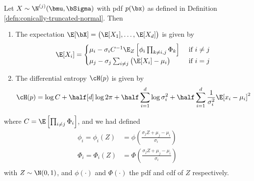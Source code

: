 \documentclass[]{article}
\begin{document}
\begin{lemma}\label{lem:expectation-entropy-truncated-mvn}
  Let $X \sim \N^{(j)}(\bmu, \bSigma)$ with pdf $p(\bx)$ as defined in Definition \ref{defn:conically-truncated-normal}. Then
  \begin{enumerate}[label=(\roman*)]
    \item The expectation $\E[\bX] = \big(\E[X_1], \dots, \E[X_d] \big)$ is given by
    \[
      \E[X_i] =
      \begin{cases}
        \mu_i - \sigma_i C^{-1} \E_Z\left[\phi_i \prod_{k \neq i,j} \Phi_k \right] 
        &\text{ if } i \neq j \\
        \mu_j - \sigma_j \sum_{i \neq j} \big(\E[X_i] - \mu_i \big) &\text{ if } i = j \\
      \end{cases}
    \]
    \item The differential entropy $\cH(p)$ is given by
    \[
    \cH(p) = \log C + \half[d] \log 2\pi + \half \sum_{i=1}^d \log \sigma_i^2 + \half \sum_{i=1}^d \frac{1}{\sigma_i^2} \E [ x_i - \mu_i ]^2
    \]
  \end{enumerate} 
  where $C = \E \left[ \prod_{i \neq j} \Phi_i \right]$, and we had defined
  \begin{align*}
    \phi_i = \phi_i(Z) &= \phi \left( \frac{\sigma_j Z + \mu_j - \mu_i}{\sigma_i} \right) \\
    \Phi_i = \Phi_i(Z) &= \Phi \left( \frac{\sigma_j Z + \mu_j - \mu_i}{\sigma_i} \right) \\    
  \end{align*}
  with $Z \sim \N(0,1)$, and $\phi(\cdot)$ and $\Phi(\cdot)$ the pdf and cdf of $Z$ respectively.
\end{lemma}
\end{document}
